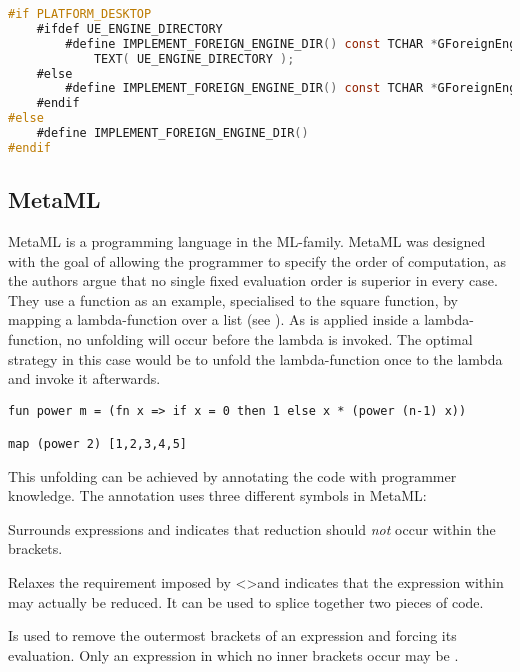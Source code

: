 \begin{lstlisting}[label={lst:unreal:macro}, caption={A macro found in ModuleManager.h in Unreal Engine}, language={C}]
#if PLATFORM_DESKTOP
	#ifdef UE_ENGINE_DIRECTORY
		#define IMPLEMENT_FOREIGN_ENGINE_DIR() const TCHAR *GForeignEngineDir = 
		    TEXT( UE_ENGINE_DIRECTORY );
	#else
		#define IMPLEMENT_FOREIGN_ENGINE_DIR() const TCHAR *GForeignEngineDir = nullptr;
	#endif
#else
	#define IMPLEMENT_FOREIGN_ENGINE_DIR() 
#endif
\end{lstlisting}

\subsection{MetaML}
MetaML is a programming language in the ML-family. MetaML was designed with the goal of allowing the programmer to specify the order of computation, as the authors argue that no single fixed evaluation order is superior in every case. They use a  function as an example, specialised to the square function, by mapping a lambda-function over a list (see ). As  is applied inside a lambda-function, no unfolding will occur before the lambda is invoked. The optimal strategy in this case would be to unfold the lambda-function once to the lambda  and invoke it afterwards.
\begin{lstlisting}[label={lst:metaml:example}, caption={MetaML squaring a list with a power-function}]
fun power m = (fn x => if x = 0 then 1 else x * (power (n-1) x))

map (power 2) [1,2,3,4,5]
\end{lstlisting}

This unfolding can be achieved by annotating the code with programmer knowledge. The annotation uses three different symbols in MetaML:
\begin{labeling}{\quad\quad}
    \item[\ttt{\textless\textgreater}] Surrounds expressions and indicates that reduction should \textit{not} occur within the brackets.
    \item[\ttt{\textasciitilde}] Relaxes the requirement imposed by \textless\textgreater and indicates that the expression within may actually be reduced. It can be used to splice together two pieces of code.
    \item[\ttt{run}] Is used to remove the outermost brackets of an expression and forcing its evaluation. Only an expression in which no inner brackets occur may be .
\end{labeling}

